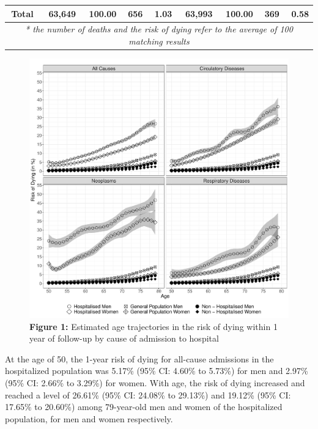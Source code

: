 \begin{landscape}
\begin{table}[H]
\begin{tabular}{ccccccccc}
    \textbf{Total} & \multicolumn{1}{r}{\textbf{63,649}} & \multicolumn{1}{r}{\textbf{100.00}} & \multicolumn{1}{r}{\textbf{656}} & \multicolumn{1}{r}{\textbf{1.03}} & \multicolumn{1}{r}{\textbf{63,993}} & \multicolumn{1}{r}{\textbf{100.00}} & \multicolumn{1}{r}{\textbf{369}} & \multicolumn{1}{r}{\textbf{0.58}} \\
    \midrule
    \midrule
    \multicolumn{9}{c}{\textit{* the number of deaths and the risk of dying refer to the average of 100 matching results}} \\
    \end{tabular}%
\label{ch2:tab2}
\end{table}%

\end{landscape}


	\begin{figure}[H]
		\centering
		\includegraphics[scale=0.425]{Paper_1/Paper1_Fig_1}
		\caption*{	\textbf{Figure 1: } Estimated age trajectories in the risk of dying 
					within 1 year of follow-up by cause of admission to hospital}
	\label{ch2:fig1}
	\end{figure}


At the age of 50, the 1-year risk of dying for all-cause admissions in 
the hospitalized population was 5.17\% (95\% CI: 4.60\% to 5.73\%) for 
men and 2.97\% (95\% CI: 2.66\% to 3.29\%) for women. With age, the risk 
of dying increased and reached a level of 26.61\% (95\% CI: 24.08\% to 
29.13\%) and 19.12\% (95\% CI: 17.65\% to 20.60\%) among 79-year-old men 
and women of the hospitalized population, for men and women respectively.

